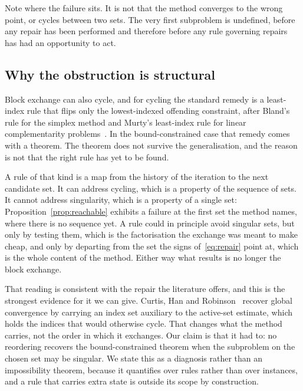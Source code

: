 Note where the failure sits. It is not that the method converges to the wrong
point, or cycles between two sets. The very first subproblem is undefined, before
any repair has been performed and therefore before any rule governing repairs has
had an opportunity to act.

\subsection{Why the obstruction is structural}
\label{ssec:structural}

Block exchange can also cycle, and for cycling the standard remedy is a least-index
rule that flips only the lowest-indexed offending constraint, after Bland's rule
for the simplex method and Murty's least-index rule for linear complementarity
problems~\cite{murty1988}. In the bound-constrained case that remedy comes with a
theorem. The theorem does not survive the generalisation, and the reason is not
that the right rule has yet to be found.

A rule of that kind is a map from the history of the iteration to the next
candidate set. It can address cycling, which is a property of the sequence of
sets. It cannot address singularity, which is a property of a single set:
Proposition~\ref{prop:reachable} exhibits a failure at the first set the method
names, where there is no sequence yet. A rule could in principle avoid singular
sets, but only by testing them, which is the factorisation the exchange was meant
to make cheap, and only by departing from the set the signs of~\eqref{eq:repair}
point at, which is the whole content of the method. Either way what results is no
longer the block exchange.

That reading is consistent with the repair the literature offers, and this is the
strongest evidence for it we can give. Curtis, Han and
Robinson~\cite{curtis2015pdas} recover global convergence by carrying an index set
auxiliary to the active-set estimate, which holds the indices that would otherwise
cycle. That changes what the method carries, not the order in which it exchanges.
Our claim is that it had to: no reordering recovers the bound-constrained theorem
when the subproblem on the chosen set may be singular. We state this as a
diagnosis rather than an impossibility theorem, because it quantifies over rules
rather than over instances, and a rule that carries extra state is outside its
scope by construction.
